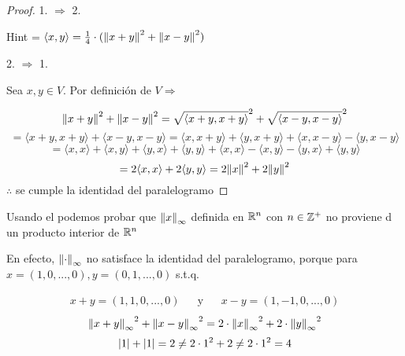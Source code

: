 \begin{proof}

    1. $\Rightarrow$ 2.
    
    Hint = $\langle x , y  \rangle = \frac{1}{4} \cdot ({\norm{x+y}}^{2}+{\norm{x-y}}^{2})$
    
    2. $\Rightarrow$ 1.

        Sea $x, y \in V$. Por definición de $V \Rightarrow$

    \begin{equation*}
       {\norm{x+y}}^{2} + {\norm{x-y}}^{2} =  {\sqrt{\langle x + y , x + y \rangle}}^{2}+ {\sqrt{\langle x - y , x - y \rangle}}^{2}
    \end{equation*}
    \begin{equation*}
        = \langle x + y , x + y \rangle + \langle x - y , x - y \rangle = \langle x , x + y \rangle + \langle y , x + y \rangle + \langle x  , x - y \rangle - \langle y , x - y \rangle
    \end{equation*}
    \begin{equation*}
        = \langle x , x  \rangle + \langle x , y \rangle+ \langle y , x \rangle + \langle y ,y \rangle + \langle x  , x \rangle - \langle x  , y \rangle - \langle y , x \rangle + \langle y , y \rangle
    \end{equation*}
    \begin{equation*}
        = 2 \langle x  , x \rangle + 2 \langle y, y \rangle = 2 {\norm{x}}^{2} + 2 {\norm{y}}^{2}
    \end{equation*}
    $\therefore$ se cumple la identidad del paralelogramo
    
\end{proof}

\begin{remark}
    Usando el  podemos probar que ${\norm{x}}_{\infty}$ definida en $\mathbb{R}^n$ con $n \in {\ensuremath{\mathbb{Z}}}^{+}$ no proviene d un producto interior de $\mathbb{R}^n$

    En efecto, ${\norm{\cdot}}_{\infty}$ no satisface la identidad del paralelogramo, porque para $x=(1,0,...,0), y =(0,1,...,0)$ s.t.q.

    \begin{align*}
    x+y = (1,1,0,...,0) & & \text{y} & & x-y = (1,-1,0,...,0)
    \end{align*}
    \begin{equation*}
        {{\norm{x+y}}_{\infty}}^{2}+{{\norm{x-y}}_{\infty}}^{2} = 2 \cdot {{\norm{x}}_{\infty}}^{2} + 2 \cdot {{\norm{y}}_{\infty}}^{2}
    \end{equation*}
    \begin{equation*}
        \abs{1} + \abs{1} = 2 \neq 2 \cdot 1^2 + 2 \neq 2 \cdot 1^2 = 4
    \end{equation*}
\end{remark}


